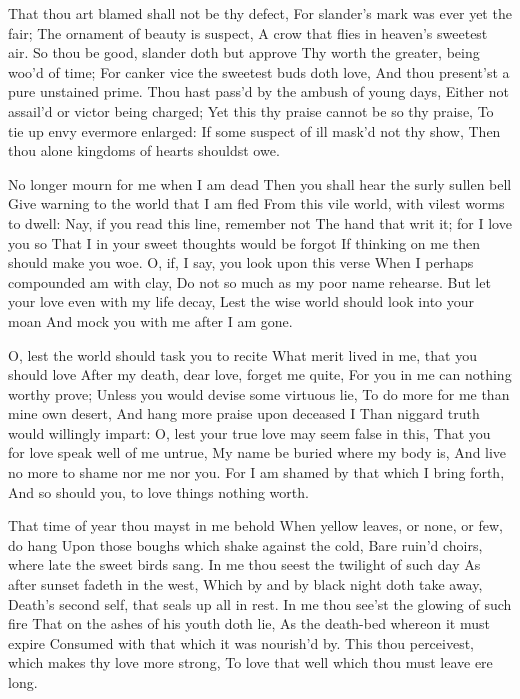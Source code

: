 \documentclass[twocolumn]{book}
\begin{document}
That thou art blamed shall not be thy defect,
For slander's mark was ever yet the fair;
The ornament of beauty is suspect,
A crow that flies in heaven's sweetest air.
\numerus*{}So thou be good, slander doth but approve
Thy worth the greater, being woo'd of time;
For canker vice the sweetest buds doth love,
And thou present'st a pure unstained prime.
Thou hast pass'd by the ambush of young days,
\numerus*{}Either not assail'd or victor being charged;
Yet this thy praise cannot be so thy praise,
To tie up envy evermore enlarged:
  If some suspect of ill mask'd not thy show,
  Then thou alone kingdoms of hearts shouldst owe.


No longer mourn for me when I am dead
Then you shall hear the surly sullen bell
Give warning to the world that I am fled
From this vile world, with vilest worms to dwell:
Nay, if you read this line, remember not
The hand that writ it; for I love you so
That I in your sweet thoughts would be forgot
If thinking on me then should make you woe.
O, if, I say, you look upon this verse
\numerus*{}When I perhaps compounded am with clay,
Do not so much as my poor name rehearse.
But let your love even with my life decay,
  Lest the wise world should look into your moan
  And mock you with me after I am gone.


O, lest the world should task you to recite
What merit lived in me, that you should love
After my death, dear love, forget me quite,
For you in me can nothing worthy prove;
Unless you would devise some virtuous lie,
To do more for me than mine own desert,
And hang more praise upon deceased I
Than niggard truth would willingly impart:
O, lest your true love may seem false in this,
That you for love speak well of me untrue,
My name be buried where my body is,
And live no more to shame nor me nor you.
  For I am shamed by that which I bring forth,
  And so should you, to love things nothing worth.


That time of year thou mayst in me behold
When yellow leaves, or none, or few, do hang
Upon those boughs which shake against the cold,
Bare ruin'd choirs, where late the sweet birds sang.
In me thou seest the twilight of such day
As after sunset fadeth in the west,
Which by and by black night doth take away,
Death's second self, that seals up all in rest.
In me thou see'st the glowing of such fire
That on the ashes of his youth doth lie,
As the death-bed whereon it must expire
Consumed with that which it was nourish'd by.
  This thou perceivest, which makes thy love more strong,
  To love that well which thou must leave ere long.
\end{document}
